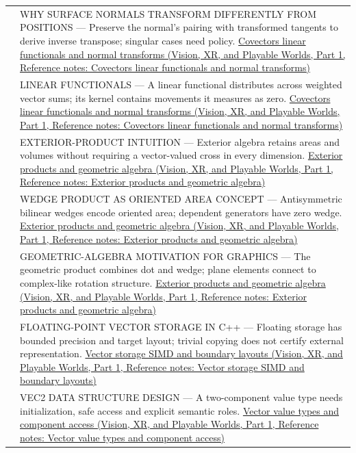 {\begin{longtable}[]{@{}
  >{\raggedright\arraybackslash}p{}
  >{\raggedright\arraybackslash}p{}@{}}
582 & WHY SURFACE NORMALS TRANSFORM DIFFERENTLY FROM POSITIONS --- Preserve the normal's pairing with transformed tangents to derive inverse transpose; singular cases need policy. \href{../07-Vision-XR-and-Playable-Worlds-P01/main.pdf\#appendix-46da295c6787}{Covectors linear functionals and normal transforms (Vision, XR, and Playable Worlds, Part 1, Reference notes: Covectors linear functionals and normal transforms)} \\
583 & LINEAR FUNCTIONALS --- A linear functional distributes across weighted vector sums; its kernel contains movements it measures as zero. \href{../07-Vision-XR-and-Playable-Worlds-P01/main.pdf\#appendix-46da295c6787}{Covectors linear functionals and normal transforms (Vision, XR, and Playable Worlds, Part 1, Reference notes: Covectors linear functionals and normal transforms)} \\
584 & EXTERIOR-PRODUCT INTUITION --- Exterior algebra retains areas and volumes without requiring a vector-valued cross in every dimension. \href{../07-Vision-XR-and-Playable-Worlds-P01/main.pdf\#appendix-e1960925d1b8}{Exterior products and geometric algebra (Vision, XR, and Playable Worlds, Part 1, Reference notes: Exterior products and geometric algebra)} \\
585 & WEDGE PRODUCT AS ORIENTED AREA CONCEPT --- Antisymmetric bilinear wedges encode oriented area; dependent generators have zero wedge. \href{../07-Vision-XR-and-Playable-Worlds-P01/main.pdf\#appendix-e1960925d1b8}{Exterior products and geometric algebra (Vision, XR, and Playable Worlds, Part 1, Reference notes: Exterior products and geometric algebra)} \\
586 & GEOMETRIC-ALGEBRA MOTIVATION FOR GRAPHICS --- The geometric product combines dot and wedge; plane elements connect to complex-like rotation structure. \href{../07-Vision-XR-and-Playable-Worlds-P01/main.pdf\#appendix-e1960925d1b8}{Exterior products and geometric algebra (Vision, XR, and Playable Worlds, Part 1, Reference notes: Exterior products and geometric algebra)} \\
587 & FLOATING-POINT VECTOR STORAGE IN C++ --- Floating storage has bounded precision and target layout; trivial copying does not certify external representation. \href{../07-Vision-XR-and-Playable-Worlds-P01/main.pdf\#appendix-26bf6bf2fb8b}{Vector storage SIMD and boundary layouts (Vision, XR, and Playable Worlds, Part 1, Reference notes: Vector storage SIMD and boundary layouts)} \\
588 & VEC2 DATA STRUCTURE DESIGN --- A two-component value type needs initialization, safe access and explicit semantic roles. \href{../07-Vision-XR-and-Playable-Worlds-P01/main.pdf\#appendix-37a39984ba66}{Vector value types and component access (Vision, XR, and Playable Worlds, Part 1, Reference notes: Vector value types and component access)} \\

\end{longtable}}

